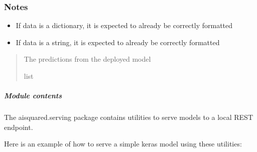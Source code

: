 \documentclass[letterpaper,10pt,english]{sphinxmanual}
\begin{document}
\begin{fulllineitems}
\begin{quote}
\begin{description}
\begin{itemize}
\end{itemize}

\end{description}\end{quote}
\subsubsection*{Notes}
\begin{itemize}
\item {} 
\sphinxAtStartPar
If data is a dictionary, it is expected to already be
correctly formatted

\item {} 
\sphinxAtStartPar
If data is a string, it is expected to already be
correctly formatted

\end{itemize}
\begin{quote}\begin{description}
\sphinxAtStartPar
{} \textendash{} The predictions from the deployed model

\sphinxAtStartPar
list

\end{description}\end{quote}

\end{fulllineitems}



\subparagraph{Module contents}
\label{\detokenize{aisquared.serving:module-aisquared.serving}}\label{\detokenize{aisquared.serving:module-contents}}
\sphinxAtStartPar
The aisquared.serving package contains utilities to serve models to a local REST endpoint.

\sphinxAtStartPar
Here is an example of how to serve a simple keras model using these utilities:

\begin{sphinxVerbatim}[commandchars=\\\{\}]
   
 
\end{sphinxVerbatim}
\end{document}
